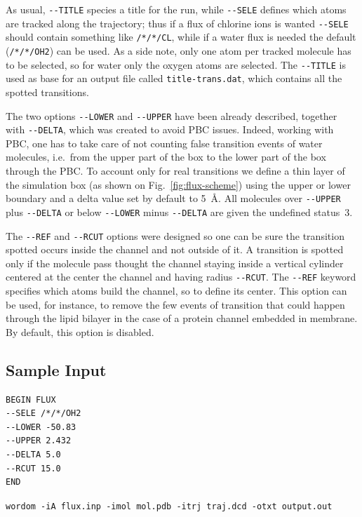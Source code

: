 \documentclass[11pt,twoside,onecolumn,a4paper,openright,notitlepage]{book}[2001/04/21]
\begin{document}
As usual, \verb#--TITLE# species a title for the run, while \verb#--SELE# defines which atoms are tracked along the trajectory; thus if a flux of chlorine ions is wanted \verb#--SELE# should contain something like \verb#/*/*/CL#, while if a water flux is needed the default (\verb#/*/*/OH2#) can be used. As a side note, only one atom per tracked molecule has to be selected, so for water only the oxygen atoms are selected. The \verb#--TITLE# is used as base for an output file called \verb#title-trans.dat#, which contains all the spotted transitions. 

The two options \verb#--LOWER# and \verb#--UPPER# have been already described, together with \verb#--DELTA#, which was created to avoid PBC issues. Indeed, working with PBC, one has to take care of not counting false transition events of water molecules, i.e.\ from the upper part of the box to the lower part of the box through the PBC. To account only for real transitions we define a thin layer of the simulation box (as shown on Fig.~\ref{fig:flux-scheme}) using the upper or lower boundary and a delta value set by default to 5~\AA. All molecules over \verb#--UPPER# plus \verb#--DELTA# or below \verb#--LOWER# minus \verb#--DELTA# are given the undefined status~3. 

The \verb#--REF# and \verb#--RCUT# options were designed so one can be sure the transition spotted occurs inside the channel and not outside of it. A transition is spotted only if the molecule pass thought the channel staying inside a vertical cylinder centered at the center the channel and having radius \verb#--RCUT#. The \verb#--REF# keyword specifies which atoms build the channel, so to define its center. This option can be used, for instance, to remove the few events of transition that could happen through the lipid bilayer in the case of a protein channel embedded in membrane. By default, this option is disabled.

\subsection*{Sample Input}

\begin{verbatim}
BEGIN FLUX
--SELE /*/*/OH2
--LOWER -50.83
--UPPER 2.432
--DELTA 5.0
--RCUT 15.0
END
\end{verbatim}
\verb#wordom -iA flux.inp -imol mol.pdb -itrj traj.dcd -otxt output.out#



\end{document}
